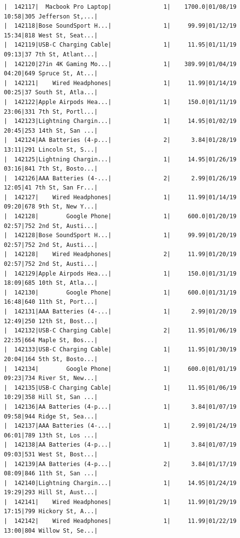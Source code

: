 \documentclass[
  letterpaper,
  DIV=11,
  numbers=noendperiod]{scrartcl}
\begin{document}
\begin{verbatim}
|  142117|  Macbook Pro Laptop|               1|    1700.0|01/08/19 10:58|305 Jefferson St,...|
|  142118|Bose SoundSport H...|               1|     99.99|01/12/19 15:34|818 West St, Seat...|
|  142119|USB-C Charging Cable|               1|     11.95|01/11/19 09:13|37 7th St, Atlant...|
|  142120|27in 4K Gaming Mo...|               1|    389.99|01/04/19 04:20|649 Spruce St, At...|
|  142121|    Wired Headphones|               1|     11.99|01/14/19 00:25|37 South St, Atla...|
|  142122|Apple Airpods Hea...|               1|     150.0|01/11/19 23:06|331 7th St, Portl...|
|  142123|Lightning Chargin...|               1|     14.95|01/02/19 20:45|253 14th St, San ...|
|  142124|AA Batteries (4-p...|               2|      3.84|01/28/19 13:11|291 Lincoln St, S...|
|  142125|Lightning Chargin...|               1|     14.95|01/26/19 03:16|841 7th St, Bosto...|
|  142126|AAA Batteries (4-...|               2|      2.99|01/26/19 12:05|41 7th St, San Fr...|
|  142127|    Wired Headphones|               1|     11.99|01/14/19 09:20|678 9th St, New Y...|
|  142128|        Google Phone|               1|     600.0|01/20/19 02:57|752 2nd St, Austi...|
|  142128|Bose SoundSport H...|               1|     99.99|01/20/19 02:57|752 2nd St, Austi...|
|  142128|    Wired Headphones|               2|     11.99|01/20/19 02:57|752 2nd St, Austi...|
|  142129|Apple Airpods Hea...|               1|     150.0|01/31/19 18:09|685 10th St, Atla...|
|  142130|        Google Phone|               1|     600.0|01/31/19 16:48|640 11th St, Port...|
|  142131|AAA Batteries (4-...|               1|      2.99|01/20/19 12:49|250 12th St, Bost...|
|  142132|USB-C Charging Cable|               2|     11.95|01/06/19 22:35|664 Maple St, Bos...|
|  142133|USB-C Charging Cable|               1|     11.95|01/30/19 20:04|164 5th St, Bosto...|
|  142134|        Google Phone|               1|     600.0|01/01/19 09:23|734 River St, New...|
|  142135|USB-C Charging Cable|               1|     11.95|01/06/19 10:29|358 Hill St, San ...|
|  142136|AA Batteries (4-p...|               1|      3.84|01/07/19 09:58|944 Ridge St, Sea...|
|  142137|AAA Batteries (4-...|               1|      2.99|01/24/19 06:01|789 13th St, Los ...|
|  142138|AA Batteries (4-p...|               1|      3.84|01/07/19 09:03|531 West St, Bost...|
|  142139|AA Batteries (4-p...|               2|      3.84|01/17/19 08:09|846 11th St, San ...|
|  142140|Lightning Chargin...|               1|     14.95|01/24/19 19:29|293 Hill St, Aust...|
|  142141|    Wired Headphones|               1|     11.99|01/29/19 17:15|799 Hickory St, A...|
|  142142|    Wired Headphones|               1|     11.99|01/22/19 13:00|804 Willow St, Se...|

\end{verbatim}
\end{document}
